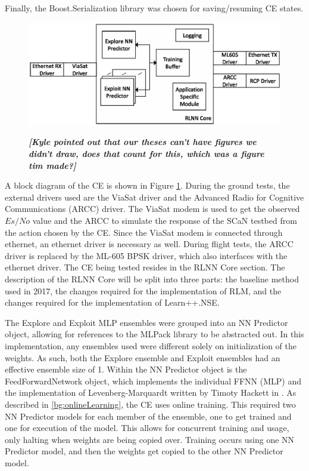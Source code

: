 \par Finally, the Boost.Serialization \cite{boost_libs} library was chosen for saving/resuming CE states. 
\begin{figure}
\caption{\textbf{\textit{[Kyle pointed out that our theses can't have figures we didn't draw, does that count for this, which was a figure tim made?]}}}
\includegraphics[width=\textwidth]{figures/software-arch.eps}
\label{fig:timOutlineBlocks}
\end{figure}
\par A block diagram of the CE is shown in Figure \ref{fig:timOutlineBlocks}. During the ground tests, the external drivers used are the ViaSat driver and the Advanced Radio for Cognitive Communications (ARCC) driver. The ViaSat modem is used to get the observed $Es/No$ value and the ARCC to simulate the response of the SCaN testbed from the action chosen by the CE. Since the ViaSat modem is connected through ethernet, an ethernet driver is necessary as well. During flight tests, the ARCC driver is replaced by the ML-605 BPSK driver, which also interfaces with the ethernet driver. The CE being tested resides in the RLNN Core section. The description of the RLNN Core will be split into three parts: the baseline method used in 2017, the changes required for the implementation of RLM, and the changes required for the implementation of Learn++.NSE.
\par The Explore and Exploit MLP ensembles were grouped into an NN Predictor object, allowing for references to the MLPack library to be abstracted out. In this implementation, any ensembles used were different solely on initialization of the weights. As such, both the Explore ensemble and Exploit ensembles had an effective ensemble size of 1. Within the NN Predictor object is the FeedForwardNetwork object, which implements the individual FFNN (MLP) and the implementation of Levenberg-Marquardt written by Timoty Hackett in \cite{tim_implementation_paper}. As described in \ref{bg:onlineLearning}, the CE uses online training. This required two NN Predictor models for each member of the ensemble, one to get trained and one for execution of the model. This allows for concurrent training and usage, only halting when weights are being copied over. Training occurs using one NN Predictor model, and then the weights get copied to the other NN Predictor model. 
